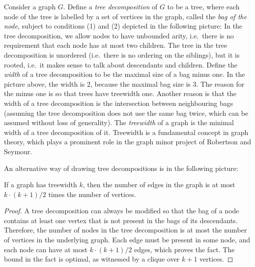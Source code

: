Consider a  graph $G$. Define a \emph{tree decomposition} of $G$  to be a tree, where each node of the tree is labelled  by a set of vertices in the graph, called the \emph{bag of the node}, subject to conditions (1) and (2) depicted in the following picture:
In the tree decomposition, we allow nodes to have unbounded arity, i.e.~there is no requirement that each node has at most two children. The tree in the tree decomposition is unordered (i.e.~there is no ordering on the siblings), but it is rooted, i.e.~it makes sense to talk about descendants and children.
Define the \emph{width} of a tree decomposition to be the maximal size of a bag minus one. In the picture above, the width is 2, because the maximal bag size is 3. The reason for the minus one is so that trees have treewidth one.  Another reason is that the width of a tree decomposition is the intersection between neighbouring bags (assuming the tree decomposition does not use the same bag twice, which can be assumed without loss of generality). 
The \emph{treewidth} of a graph is the minimal width of a tree decomposition of it.  Treewidth is a fundamental concept in graph theory, which plays a prominent role in the graph minor project of Robertson and Seymour. 

An alternative way of drawing tree decompositions is in the following picture:

\begin{fact}\label{fact:tw-sparse}
	If a graph has treewidth $k$, then the number of edges in the graph is at most $k \cdot (k+1) / 2$ times the number of vertices.
\end{fact}
\begin{proof}
	A tree decomposition can always be modified so that the bag of a node contains at least one vertex that is not present in the bags of its descendants. Therefore, the number of nodes in the tree decomposition is at most the number of vertices in the underlying graph. Each edge must be present in some node, and each node can have at most $k \cdot (k+1) / 2 $ edges, which proves the fact.  The bound in the fact is optimal, as witnessed by   a clique over $k+1$ vertices.
\end{proof}


